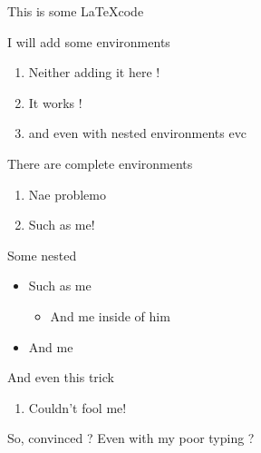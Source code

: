 \documentclass{article}
\begin{document}
    This is some \LaTeX code

    I will add some environments

    \begin{enumerate}
        \item Neither adding it here !
        \item It works !
        \item and even with nested environments evc
    \end{enumerate}

    There are complete environments
    \begin{enumerate}
        \item Nae problemo
        \item Such as me!
    \end{enumerate}

    Some nested
    \begin{itemize}
        \item Such as me
        \begin{itemize}
            \item And me inside of him
        \end{itemize}
        \item And me
    \end{itemize}


    And even this trick
    \begin{enumerate}
        \item Couldn't fool me!
    \end{enumerate}

    So, convinced ? Even with my poor typing ?
\end{document}
